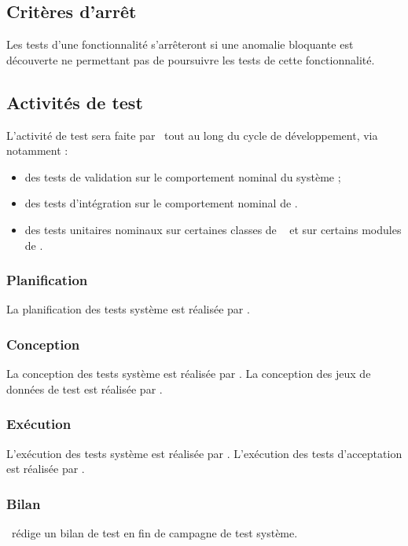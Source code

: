 \subsection{Critères d’arrêt}
\label{sec:process:arret}

Les tests d’une fonctionnalité s’arrêteront si une anomalie bloquante est découverte ne permettant pas de poursuivre les tests de cette fonctionnalité.

\subsection{Activités de test}
\label{sec:process:activites}  
  
L’activité de test sera faite par \equipe~tout au long du cycle de développement, via notamment :
\begin{itemize}
    \item des tests de validation sur le comportement nominal du système ;
    \item des tests d'intégration sur le comportement nominal de \appliC.
    \item des tests unitaires nominaux sur certaines classes de \appliA~ et sur certains modules de \appliC. 
\end{itemize}

\subsubsection{Planification}
La planification des tests système est réalisée par \equipe.

\subsubsection{Conception}
La conception des tests système est réalisée par \equipe.
La conception des jeux de données de test est réalisée par \equipe.

\subsubsection{Exécution}
L’exécution des tests système est réalisée par \equipe.
L’exécution des tests d’acceptation est réalisée par \client.

\subsubsection{Bilan}
\equipe~rédige un bilan de test en fin de campagne de test système.

